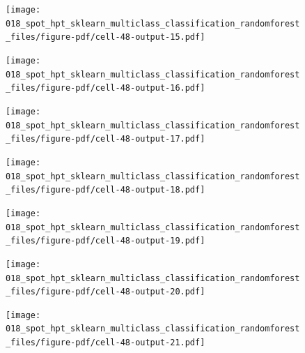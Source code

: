 \documentclass[
  letterpaper,
  DIV=11,
  numbers=noendperiod]{scrreprt}
\begin{document}
\begin{figure}[H]

{\centering \texttt{[image: 018\_spot\_hpt\_sklearn\_multiclass\_classification\_randomforest\_files/figure-pdf/cell-48-output-15.pdf]}

}

\end{figure}

\begin{figure}[H]

{\centering \texttt{[image: 018\_spot\_hpt\_sklearn\_multiclass\_classification\_randomforest\_files/figure-pdf/cell-48-output-16.pdf]}

}

\end{figure}

\begin{figure}[H]

{\centering \texttt{[image: 018\_spot\_hpt\_sklearn\_multiclass\_classification\_randomforest\_files/figure-pdf/cell-48-output-17.pdf]}

}

\end{figure}

\begin{figure}[H]

{\centering \texttt{[image: 018\_spot\_hpt\_sklearn\_multiclass\_classification\_randomforest\_files/figure-pdf/cell-48-output-18.pdf]}

}

\end{figure}

\begin{figure}[H]

{\centering \texttt{[image: 018\_spot\_hpt\_sklearn\_multiclass\_classification\_randomforest\_files/figure-pdf/cell-48-output-19.pdf]}

}

\end{figure}

\begin{figure}[H]

{\centering \texttt{[image: 018\_spot\_hpt\_sklearn\_multiclass\_classification\_randomforest\_files/figure-pdf/cell-48-output-20.pdf]}

}

\end{figure}

\begin{figure}[H]

{\centering \texttt{[image: 018\_spot\_hpt\_sklearn\_multiclass\_classification\_randomforest\_files/figure-pdf/cell-48-output-21.pdf]}

}

\end{figure}
\end{document}
